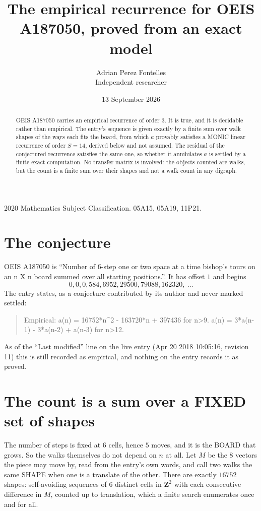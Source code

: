 \documentclass[11pt,a4paper]{article}
\title{The empirical recurrence for OEIS A187050, proved from an exact model}
\author{Adrian Perez Fontelles\\ \small Independent researcher}
\date{13 September 2026}
\theoremstyle{plain}
\theoremstyle{definition}
\begin{document}
\maketitle

\begin{abstract}
OEIS A187050 carries an empirical recurrence of order $3$. It is true, and it is
decidable rather than empirical. The entry's sequence is given exactly by a finite sum over walk shapes of the ways each fits the board, from
which $a$ provably satisfies a MONIC linear recurrence of order $S=14$, derived below and not
assumed. The residual of the conjectured recurrence satisfies the same one, so whether it
annihilates $a$ is settled by a finite exact computation. No transfer matrix is involved: the objects counted are walks, but the count is a finite sum over their shapes and not a walk count in any digraph.
\end{abstract}

\noindent\small 2020 Mathematics Subject Classification. 05A15, 05A19, 11P21.\normalsize

\section{The conjecture}

OEIS A187050 is ``Number of 6-step one or two space at a time bishop's tours on an n X n board summed over all starting positions.''. It has offset $1$ and begins
\[
0, 0, 0, 584, 6952, 29500, 79088, 162320,\ \dots
\]
The entry states, as a conjecture contributed by its author and never marked settled:
\begin{quote}
Empirical: a(n) = 16752*n\^{}2 - 163720*n + 397436 for n>9. a(n) = 3*a(n-1) - 3*a(n-2) + a(n-3) for n>12.
\end{quote}
As of the ``Last modified'' line on the live entry (Apr 20 2018 10:05:16, revision 11)
this is still recorded as empirical, and nothing on the entry records it as proved.

\section{The count is a sum over a FIXED set of shapes}

The number of steps is fixed at $6$ cells, hence $5$ moves, and it is the BOARD
that grows. So the walks themselves do not depend on $n$ at all. Let $M$ be the $8$
vectors the piece may move by, read from the entry's own words, and call two walks the same
SHAPE when one is a translate of the other. There are exactly $16752$ shapes: self-avoiding
sequences of $6$ distinct cells in $\mathbf{Z}^{2}$ with each consecutive difference in
$M$, counted up to translation, which a finite search enumerates once and for all.
\end{document}

